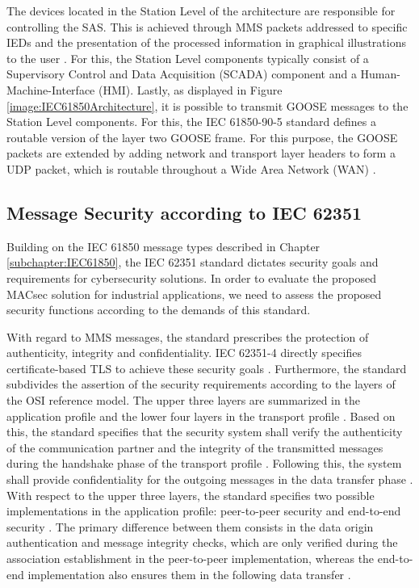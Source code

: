 \documentclass[conference, onecolumn, a4paper]{IEEEtran}
\begin{document}
\smallskip
The devices located in the Station Level of the architecture are responsible for controlling the SAS. This is achieved through MMS packets addressed 
to specific IEDs and the presentation of the processed information in graphical illustrations to the user \cite{SGRWin_IEC61850Architecture:2021}. 
For this, the Station Level components typically consist of a Supervisory Control and Data Acquisition (SCADA) component and a Human-Machine-Interface 
(HMI). Lastly, as displayed in Figure \ref{image:IEC61850Architecture}, it is possible to transmit GOOSE messages to the Station Level components. 
For this, the IEC 61850-90-5 standard \cite{IEC61850-90-5:2012} defines a routable version of the layer two GOOSE frame. For this purpose, the GOOSE 
packets are extended by adding network and transport layer headers to form a UDP packet, which is routable throughout a Wide Area Network (WAN) 
\cite{routable_GOOSE_SV:2020}.

\subsection{Message Security according to IEC 62351}
\noindent Building on the IEC 61850 message types described in Chapter \ref{subchapter:IEC61850}, the IEC 62351 standard \cite{IEC62351:2024} dictates 
security goals and requirements for cybersecurity solutions. In order to evaluate the proposed MACsec solution for industrial applications, 
we need to assess the proposed security functions according to the demands of this standard.

\smallskip
With regard to MMS messages, the standard prescribes the protection of authenticity, integrity and confidentiality. IEC 62351-4 directly specifies 
certificate-based TLS to achieve these security goals \cite{SecureMMS:2020}. Furthermore, the standard subdivides the assertion of the security requirements 
according to the layers of the OSI reference model. The upper three layers are summarized in the application profile and the lower four layers in the 
transport profile \cite{SecureMMS:2020}. Based on this, the standard specifies that the security system shall verify the authenticity of the communication 
partner and the integrity of the transmitted messages during the handshake phase of the transport profile \cite{Review_IEC62351:2019}. Following this, 
the system shall provide confidentiality for the outgoing messages in the data transfer phase \cite{SecureMMS:2020}. With respect to the upper three 
layers, the standard specifies two possible implementations in the application profile: peer-to-peer security and end-to-end security 
\cite{Review_IEC62351:2019}. The primary difference between them consists in the data origin authentication and message integrity checks, which are only 
verified during the association establishment in the peer-to-peer implementation, whereas the end-to-end implementation also ensures them in the following 
data transfer \cite{Review_IEC62351:2019}.
\end{document}
